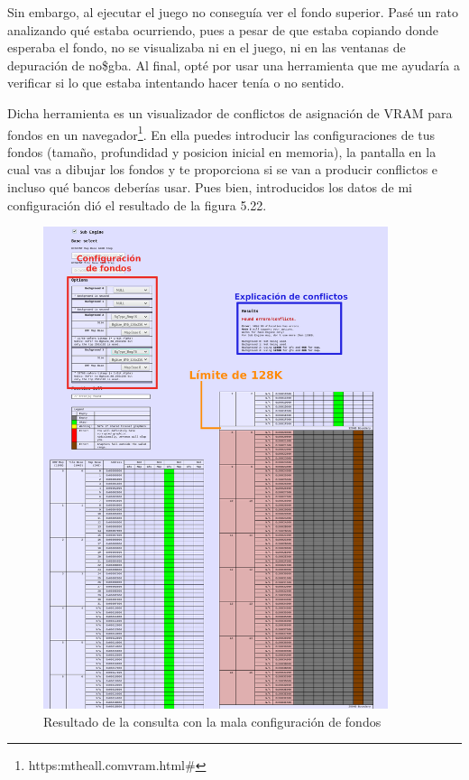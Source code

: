 \vspace{0.5cm}

Sin embargo, al ejecutar el juego no conseguía ver el fondo superior. Pasé un rato analizando qué estaba ocurriendo, pues a pesar de que estaba copiando donde esperaba el fondo, no se visualizaba ni en el juego, ni en las ventanas de depuración de no\$gba. Al final, opté por usar una herramienta que me ayudaría a verificar si lo que estaba intentando hacer tenía o no sentido.

\vspace{0.5cm}

Dicha herramienta es un visualizador de conflictos de asignación de VRAM para fondos en un navegador\footnote{https:\/\/mtheall.com\/vram.html\#}. En ella puedes introducir las configuraciones de tus fondos (tamaño, profundidad y posicion inicial en memoria), la pantalla en la cual vas a dibujar los fondos y te proporciona si se van a producir conflictos e incluso qué bancos deberías usar. Pues bien, introducidos los datos de mi configuración dió el resultado de la figura 5.22.

\vspace{0.5cm}

\begin{figure}[htbp]
\centering
  \includegraphics[width=0.9\textwidth]{archivos/vram_allocator.png}
  \caption{Resultado de la consulta con la mala configuración de fondos}
  \label{fig:vram_allocator_problem}
\end{figure}

